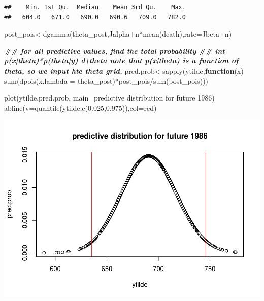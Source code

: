 \documentclass[
]{book}
\newenvironment{Shaded}{\begin{snugshade}}{\end{snugshade}}
\newcommand{\AttributeTok}[1]{\textcolor[rgb]{0.77,0.63,0.00}{#1}}
\newcommand{\ControlFlowTok}[1]{\textcolor[rgb]{0.13,0.29,0.53}{\textbf{#1}}}
\newcommand{\DocumentationTok}[1]{\textcolor[rgb]{0.56,0.35,0.01}{\textbf{\textit{#1}}}}
\newcommand{\FloatTok}[1]{\textcolor[rgb]{0.00,0.00,0.81}{#1}}
\newcommand{\FunctionTok}[1]{\textcolor[rgb]{0.00,0.00,0.00}{#1}}
\newcommand{\NormalTok}[1]{#1}
\newcommand{\OtherTok}[1]{\textcolor[rgb]{0.56,0.35,0.01}{#1}}
\newcommand{\SpecialCharTok}[1]{\textcolor[rgb]{0.00,0.00,0.00}{#1}}
\newcommand{\StringTok}[1]{\textcolor[rgb]{0.31,0.60,0.02}{#1}}
\theoremstyle{definition}
\theoremstyle{definition}
\theoremstyle{definition}
\theoremstyle{definition}
\theoremstyle{remark}
\begin{document}
\begin{verbatim}
##    Min. 1st Qu.  Median    Mean 3rd Qu.    Max. 
##   604.0   671.0   690.0   690.6   709.0   782.0
\end{verbatim}

\begin{Shaded}
\begin{Highlighting}[]
\NormalTok{   post\_pois}\OtherTok{\textless{}{-}}\FunctionTok{dgamma}\NormalTok{(theta\_post,Jalpha}\SpecialCharTok{+}\NormalTok{n}\SpecialCharTok{*}\FunctionTok{mean}\NormalTok{(death),}\AttributeTok{rate=}\NormalTok{Jbeta}\SpecialCharTok{+}\NormalTok{n)}

\DocumentationTok{\#\# for all predictive values,  find the total probability  }
   \DocumentationTok{\#\# int p(x|theta)*p(theta|y) d\textbackslash{}theta  note that p(x|theta) is a function of theta, so we input hte theta grid.}
\NormalTok{ pred.prob}\OtherTok{\textless{}{-}}\FunctionTok{sapply}\NormalTok{(ytilde,}\ControlFlowTok{function}\NormalTok{(x) }\FunctionTok{sum}\NormalTok{(}\FunctionTok{dpois}\NormalTok{(x,}\AttributeTok{lambda =}\NormalTok{ theta\_post)}\SpecialCharTok{*}\NormalTok{post\_pois}\SpecialCharTok{/}\FunctionTok{sum}\NormalTok{(post\_pois)))  }
  
 \FunctionTok{plot}\NormalTok{(ytilde,pred.prob, }\AttributeTok{main=}\StringTok{\textquotesingle{}predictive distribution for future 1986\textquotesingle{}}\NormalTok{)}
 \FunctionTok{abline}\NormalTok{(}\AttributeTok{v=}\FunctionTok{quantile}\NormalTok{(ytilde,}\FunctionTok{c}\NormalTok{(}\FloatTok{0.025}\NormalTok{,}\FloatTok{0.975}\NormalTok{)),}\AttributeTok{col=}\StringTok{\textquotesingle{}red\textquotesingle{}}\NormalTok{)}
\end{Highlighting}
\end{Shaded}

\includegraphics{_main_files/figure-latex/unnamed-chunk-26-2.pdf}
\end{document}
